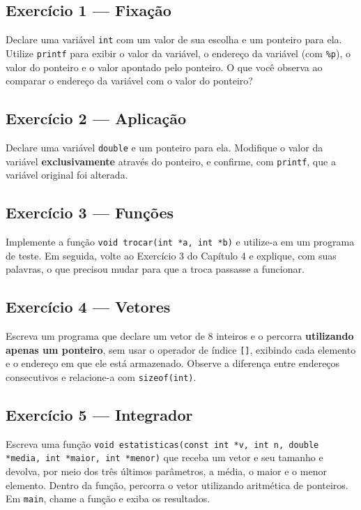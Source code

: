 \begin{exercicio}

\subsection*{Exercício 1 --- Fixação}
Declare uma variável \texttt{int} com um valor de sua escolha e um ponteiro para ela. Utilize \texttt{printf} para exibir o valor da variável, o endereço da variável (com \texttt{\%p}), o valor do ponteiro e o valor apontado pelo ponteiro. O que você observa ao comparar o endereço da variável com o valor do ponteiro?

\subsection*{Exercício 2 --- Aplicação}
Declare uma variável \texttt{double} e um ponteiro para ela. Modifique o valor da variável \textbf{exclusivamente} através do ponteiro, e confirme, com \texttt{printf}, que a variável original foi alterada.

\subsection*{Exercício 3 --- Funções}
Implemente a função \texttt{void trocar(int *a, int *b)} e utilize-a em um programa de teste. Em seguida, volte ao Exercício 3 do Capítulo 4 e explique, com suas palavras, o que precisou mudar para que a troca passasse a funcionar.

\subsection*{Exercício 4 --- Vetores}
Escreva um programa que declare um vetor de 8 inteiros e o percorra \textbf{utilizando apenas um ponteiro}, sem usar o operador de índice \texttt{[]}, exibindo cada elemento e o endereço em que ele está armazenado. Observe a diferença entre endereços consecutivos e relacione-a com \texttt{sizeof(int)}.

\subsection*{Exercício 5 --- Integrador}
Escreva uma função \texttt{void estatisticas(const int *v, int n, double *media, int *maior, int *menor)} que receba um vetor e seu tamanho e devolva, por meio dos três últimos parâmetros, a média, o maior e o menor elemento. Dentro da função, percorra o vetor utilizando aritmética de ponteiros. Em \texttt{main}, chame a função e exiba os resultados.


\end{exercicio}
